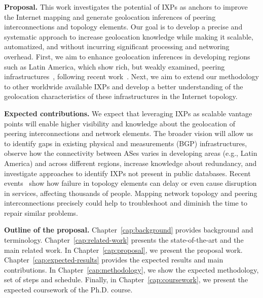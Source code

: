 	\textbf{Proposal.} This work investigates the potential of IXPs as anchors to improve the Internet mapping and generate geolocation inferences of peering interconnections and topology elements. Our goal is to develop a precise and systematic approach to increase geolocation knowledge while making it scalable, automatized, and without incurring significant processing and networing overhead. First, we aim to enhance geolocation inferences in developing regions such as Latin America, which show rich, but weakly examined, peering infrastructures~\cite{IXbr, DissectingBrazilianIXP}, following recent work~\cite{10.1007/978-3-319-15509-8_4, Fanou:2017:ICC:3131365.3131394}. Next, we aim to extend our methodology to other worldwide available IXPs and develop a better understanding of the geolocation characteristics of these infrastructures in the Internet topology.


	\textbf{Expected contributions.} We expect that leveraging IXPs as scalable vantage points will enable higher visibility and knowledge about the geolocation of peering interconnections and network elements. The broader vision will allow us to identify gaps in existing physical and measurements (BGP) infrastructures, observe how the connectivity between ASes varies in developing areas (e.g., Latin America) and across different regions, increase knowledge about redundancy, and investigate approaches to identify IXPs not present in public databases. 
	Recent events~\cite{routerDMV, routerUnited} show how failure in topology elements can delay or even cause disruption in services, affecting thousands of people. Mapping network topology and peering interconnections precisely could help to troubleshoot and diminish the time to repair similar problems.

	\textbf{Outline of the proposal.} Chapter~\ref{cap:background} provides background and terminology. Chapter~\ref{cap:related-work} presents the state-of-the-art and the main related work. In Chapter~\ref{cap:proposal}, we present the proposal work. Chapter~\ref{cap:expected-results} provides the expected results and main contributions. In Chapter~\ref{cap:methodology}, we show the expected methodology, set of steps and schedule. Finally, in Chapter~\ref{cap:coursework}, we present the expected coursework of the Ph.D. course.


